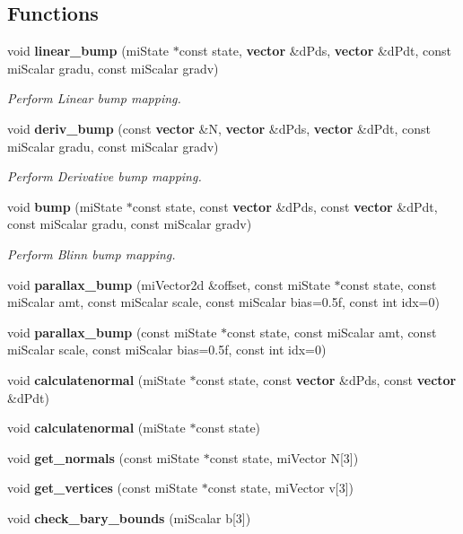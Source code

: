 \subsection*{Functions}
\begin{CompactItemize}
\item 
void {\bf linear\_\-bump} (mi\-State $\ast$const state, {\bf vector} \&d\-Pds, {\bf vector} \&d\-Pdt, const mi\-Scalar gradu, const mi\-Scalar gradv)
\begin{CompactList}\small\item\em Perform Linear bump mapping. \item\end{CompactList}\item 
void {\bf deriv\_\-bump} (const {\bf vector} \&N, {\bf vector} \&d\-Pds, {\bf vector} \&d\-Pdt, const mi\-Scalar gradu, const mi\-Scalar gradv)
\begin{CompactList}\small\item\em Perform Derivative bump mapping. \item\end{CompactList}\item 
void {\bf bump} (mi\-State $\ast$const state, const {\bf vector} \&d\-Pds, const {\bf vector} \&d\-Pdt, const mi\-Scalar gradu, const mi\-Scalar gradv)
\begin{CompactList}\small\item\em Perform Blinn bump mapping. \item\end{CompactList}\item 
void {\bf parallax\_\-bump} (mi\-Vector2d \&offset, const mi\-State $\ast$const state, const mi\-Scalar amt, const mi\-Scalar scale, const mi\-Scalar bias=0.5f, const int idx=0)
\item 
void {\bf parallax\_\-bump} (const mi\-State $\ast$const state, const mi\-Scalar amt, const mi\-Scalar scale, const mi\-Scalar bias=0.5f, const int idx=0)
\item 
void {\bf calculatenormal} (mi\-State $\ast$const state, const {\bf vector} \&d\-Pds, const {\bf vector} \&d\-Pdt)
\item 
void {\bf calculatenormal} (mi\-State $\ast$const state)
\item 
void {\bf get\_\-normals} (const mi\-State $\ast$const state, mi\-Vector N[3])
\item 
void {\bf get\_\-vertices} (const mi\-State $\ast$const state, mi\-Vector v[3])
\item 
void {\bf check\_\-bary\_\-bounds} (mi\-Scalar b[3])

\end{CompactItemize}
